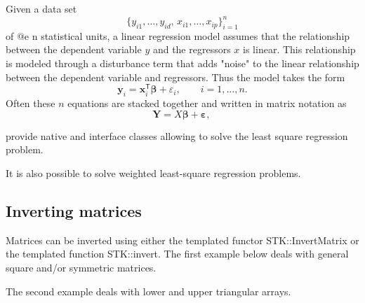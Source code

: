 \documentclass[a4paper,10pt]{article}
\begin{document}
Given a data set
\[ \{y_{i1},\ldots,y_{id},\, x_{i1}, \ldots, x_{ip}\}_{i=1}^n \]
of @e n statistical units, a linear regression model assumes that the
relationship between the dependent variable $y$ and the regressors $x$
is linear. This relationship is modeled through a disturbance term
that adds "noise" to the linear relationship between the dependent
variable and regressors. Thus the model takes the form
\[
\mathbf{y}_i = \mathbf{x}^\mathsf{T}_i \boldsymbol\beta + \varepsilon_i,
\qquad i = 1, \ldots, n.
\]
Often these $n$ equations are stacked together and written in matrix notation
as
\[
\mathbf{Y} = X\boldsymbol\beta + \boldsymbol\varepsilon, \,
\]

\stkpp{} provide native and \lapack{} interface classes allowing to solve the
least square regression problem.

\begin{minipage}[t]{0.66\textwidth}

\end{minipage}
\hspace{0.2cm}
\begin{minipage}[t]{0.33\textwidth}
\addtocounter{lstlisting}{-1}

\end{minipage}

\begin{note}
It is also possible to solve weighted least-square regression problems.
\end{note}

\subsection{Inverting matrices}
Matrices can be inverted using either the templated functor STK::InvertMatrix or the templated
function STK::invert. The first example below deals with general square and/or symmetric matrices.

\begin{minipage}[t]{0.55\textwidth}

\end{minipage}
\hspace{0.2cm}
\begin{minipage}[t]{0.43\textwidth}
\addtocounter{lstlisting}{-1}

\end{minipage}

The second example deals with lower and upper triangular arrays.
\end{document}
